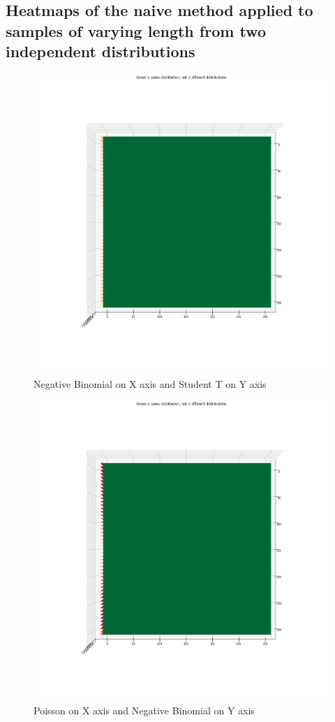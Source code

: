 \subsection{Heatmaps of the naive method applied to samples of varying length from two independent distributions}
\label{app:naive_heatmaps}
\begin{figure}[htb]
  \centering
  \includegraphics[width=\linewidth]{./img/hypothesis_test/appendix/naive_X_neg_bin_Y_student_t.png}
  \caption{Negative Binomial on X axis and Student T on Y axis}
\end{figure}
\clearpage
\begin{figure}[htb]
  \centering
  \includegraphics[width=\linewidth]{./img/hypothesis_test/appendix/naive_X_poisson_Y_neg_bin.png}
  \caption{Poisson on X axis and Negative Binomial on Y axis}
\end{figure}
